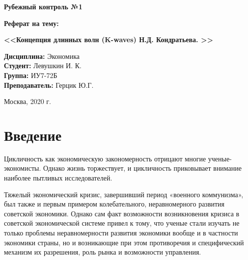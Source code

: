 \documentclass[a4paper,14pt]{extarticle}
\begin{document}
 	\LARGE
 	\begin{center}
 		\textbf{Рубежный контроль №1}
 		
 		\textbf{Реферат на тему:}
 		
 		\textbf{<<Концепция длинных волн (K-waves) Н.Д. Кондратьева. >>}
 	\end{center}
 	
 	
 	\vspace*{15mm}
 	
 	\large
 	\begin{flushleft}
 		\textbf{Дисциплина:} Экономика \\
 		\textbf{Студент:} Левушкин И. К. \\
 		\textbf{Группа:} ИУ7-72Б \\
 		\textbf{Преподаватель:} Герцик Ю.Г.\\
 	\end{flushleft}
 	
 	\vspace*{50mm}
 	
 	\large
 	\begin{center}
 		Москва, 2020 г.
 	\end{center}
 	
 	\thispagestyle{empty}
 	
 	\newpage
 	
 	\tableofcontents
 	\newpage
 	\section*{Введение}
 	
 	Цикличность как экономическую закономерность отрицают многие ученые-экономисты. Однако жизнь торжествует, и цикличность приковывает внимание наиболее пытливых исследователей.
 	
 	Тяжелый экономический кризис, завершивший период «военного коммунизма», был также и первым примером колебательного, неравномерного развития советской экономики. Однако сам факт возможности возникновения кризиса в советской экономической системе привел к тому, что ученые стали изучать не только проблемы неравномерности развития экономики вообще и в частности экономики страны, но и возникающие при этом противоречия и специфический механизм их разрешения, роль рынка и возможности управления.
 	
\end{document}
